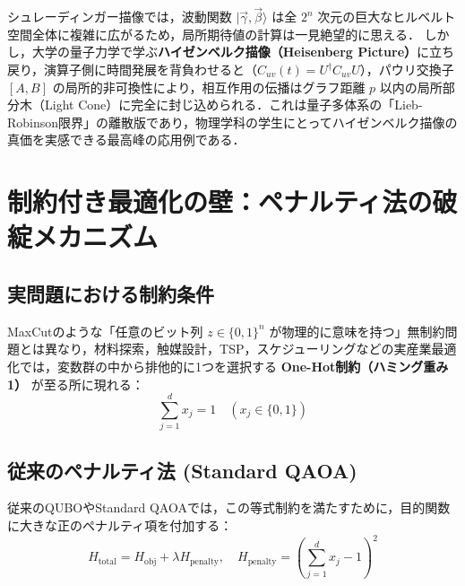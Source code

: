 \documentclass[11pt,a4paper,oneside,openany]{ltjsbook}
\theoremstyle{definition}
\theoremstyle{plain}
\theoremstyle{remark}
\newcommand{\ket}[1]{|#1\rangle}
\begin{document}
\enlargethispage{2.5\baselineskip}
\begin{insightbox}[ハイゼンベルク描像がもたらす幾何学的奇跡]
シュレーディンガー描像では，波動関数 $\ket{\vec{\gamma}, \vec{\beta}}$ は全 $2^n$ 次元の巨大なヒルベルト空間全体に複雑に広がるため，局所期待値の計算は一見絶望的に思える．
しかし，大学の量子力学で学ぶ\textbf{ハイゼンベルク描像（Heisenberg Picture）}に立ち戻り，演算子側に時間発展を背負わせると（$C_{uv}(t) = U^\dagger C_{uv} U$），パウリ交換子 $[A, B]$ の局所的非可換性により，相互作用の伝播はグラフ距離 $p$ 以内の局所部分木（Light Cone）に完全に封じ込められる．これは量子多体系の「Lieb-Robinson限界」の離散版であり，物理学科の学生にとってハイゼンベルク描像の真価を実感できる最高峰の応用例である．
\end{insightbox}

\chapter{制約付き最適化の壁：ペナルティ法の破綻メカニズム}
\enlargethispage{5\baselineskip}
\vspace{-4mm}

\vspace{-2.5mm}
\section{実問題における制約条件}
MaxCutのような「任意のビット列 $z \in \{0, 1\}^n$ が物理的に意味を持つ」無制約問題とは異なり，材料探索，触媒設計，TSP，スケジューリングなどの実産業最適化では，変数群の中から排他的に1つを選択する \textbf{One-Hot制約（ハミング重み1）} が至る所に現れる：
\begin{equation}
    \sum_{j=1}^{d} x_j = 1 \quad (x_j \in \{0, 1\})
\end{equation}

\vspace{-2.5mm}
\section{従来のペナルティ法 (Standard QAOA)}
従来のQUBOやStandard QAOAでは，この等式制約を満たすために，目的関数に大きな正のペナルティ項を付加する\cite{lucas2014ising}：
\begin{equation}
    H_{\text{total}} = H_{\text{obj}} + \lambda H_{\text{penalty}}, \quad H_{\text{penalty}} = \left( \sum_{j=1}^d x_j - 1 \right)^2
\end{equation}

\vspace{-2.5mm}
\end{document}
